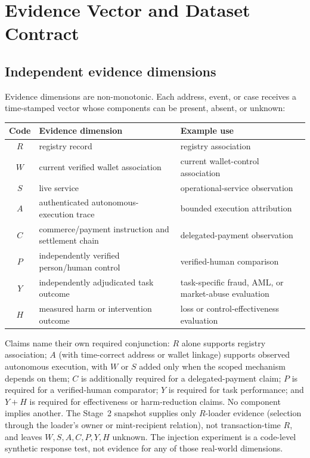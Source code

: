
\section{Evidence Vector and Dataset Contract}\label{app:dataset}

\subsection{Independent evidence dimensions}

Evidence dimensions are non-monotonic.  Each address, event, or case receives a
time-stamped vector whose components can be present, absent, or unknown:

\begin{table}[h]
\centering
\small
\begin{tabularx}{\textwidth}{@{}c l X@{}}
\toprule
\textbf{Code} & \textbf{Evidence dimension} & \textbf{Example use} \\
\midrule
$R$ & registry record & registry association \\
$W$ & current verified wallet association & current wallet-control association \\
$S$ & live service & operational-service observation \\
$A$ & authenticated autonomous-execution trace & bounded execution attribution \\
$C$ & commerce/payment instruction and settlement chain & delegated-payment observation \\
$P$ & independently verified person/human control & verified-human comparison \\
$Y$ & independently adjudicated task outcome & task-specific fraud, AML, or market-abuse evaluation \\
$H$ & measured harm or intervention outcome & loss or control-effectiveness evaluation \\
\bottomrule
\end{tabularx}
\end{table}

Claims name their own required conjunction: $R$ alone supports registry
association; $A$ (with time-correct address or wallet linkage) supports observed
autonomous execution, with $W$ or $S$ added only when the scoped mechanism
depends on them; $C$ is additionally required for a delegated-payment claim;
$P$ is required for a verified-human comparator; $Y$ is required for task
performance; and $Y+H$ is required for effectiveness or harm-reduction claims.
No component implies another. The Stage~2 snapshot supplies only $R$-loader
evidence (selection through the loader's owner or mint-recipient relation), not
transaction-time $R$, and leaves $W,S,A,C,P,Y,H$ unknown. The injection experiment is a code-level
synthetic response test, not evidence for any of those real-world dimensions.

